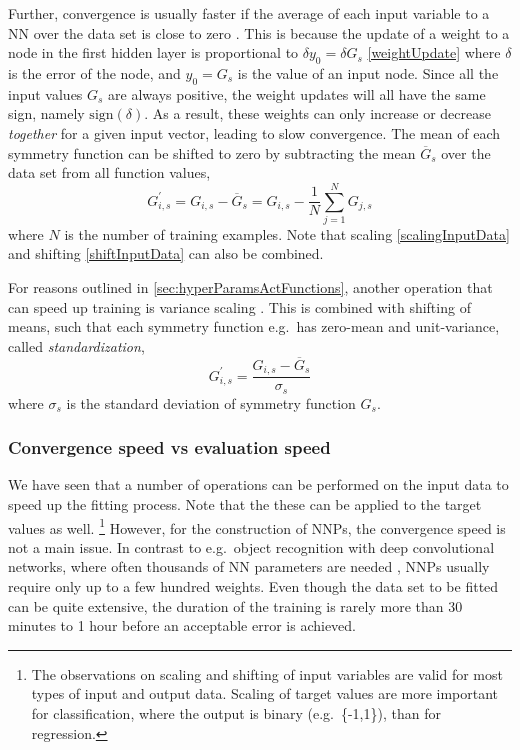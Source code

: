 \documentclass[twoside,english]{uiofysmaster}
\begin{document}
Further, convergence is usually faster if the average of each input variable to a NN over the 
data set is close to zero \cite{LeCun12}.
This is because the update of a weight to a node in the first hidden layer is proportional 
to $\delta y_0 = \delta G_s$ \eqref{weightUpdate} where $\delta$ is the error of the node,
and $y_0 = G_s$ is the value of an input node. 
Since all the input values $G_s$ are always positive, the weight updates will all have the same sign, namely $\mathrm{sign}(\delta)$. 
As a result, these weights can only increase or decrease \textit{together} for a given input vector, leading to slow convergence.
The mean of each symmetry function can be shifted to zero by subtracting the mean $\overline{G}_s$ over the data set from 
all function values,
\begin{equation}
 G_{i,s}^\prime = G_{i,s} - \overline{G}_s =  G_{i,s} - \frac{1}{N}\sum_{j=1}^N G_{j,s}
 \label{shiftInputData}
\end{equation}
where $N$ is the number of training examples. Note that scaling \eqref{scalingInputData} and shifting \eqref{shiftInputData}
can also be combined. 

For reasons outlined in \autoref{sec:hyperParamsActFunctions},
another operation that can speed up training is variance scaling \cite{LeCun12}.
This is combined with shifting of means, such that each symmetry function e.g.\ has zero-mean and unit-variance,
called \textit{standardization},
\begin{equation}
 G_{i,s}^\prime = \frac{G_{i,s} - \overline{G}_s}{\sigma_s} 
 \label{scaleVariance}
\end{equation}
where $\sigma_s$ is the standard deviation of symmetry function $G_s$. 

\subsubsection{Convergence speed vs evaluation speed}
We have seen that a number of operations can be performed on the input data to speed up the fitting process.  
Note that the these can be applied to the target values as well.  
\footnote{The observations on scaling and shifting of input variables are valid for most 
types of input and output data. Scaling of target values are more important 
for classification, where the output is binary (e.g.\ \{-1,1\}), than for regression.} However, for the construction of NNPs, 
the convergence speed is not a main issue. In contrast to e.g.\ object recognition with deep convolutional networks, where
often thousands of NN parameters are needed \cite{LeCun99}, NNPs usually require only up to a few hundred weights. Even though 
the data set to be fitted can be quite extensive, the duration of the training is rarely more than 30 minutes to 1 hour before 
an acceptable error is achieved.
\end{document}

